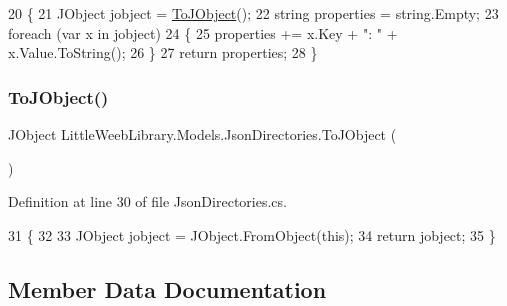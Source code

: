 \begin{DoxyCode}
20         \{
21             JObject jobject = \mbox{\hyperlink{class_little_weeb_library_1_1_models_1_1_json_directories_a66a155b005f6c2c19eb95ddd912a64ee}{ToJObject}}();
22             \textcolor{keywordtype}{string} properties = \textcolor{keywordtype}{string}.Empty;
23             \textcolor{keywordflow}{foreach} (var x \textcolor{keywordflow}{in} jobject)
24             \{
25                 properties += x.Key + \textcolor{stringliteral}{": "} + x.Value.ToString();
26             \}
27             \textcolor{keywordflow}{return} properties;
28         \}
\end{DoxyCode}
\mbox{\label{class_little_weeb_library_1_1_models_1_1_json_directories_a66a155b005f6c2c19eb95ddd912a64ee}} 
\subsubsection{\texorpdfstring{To\+J\+Object()}{ToJObject()}}
{\footnotesize\ttfamily J\+Object Little\+Weeb\+Library.\+Models.\+Json\+Directories.\+To\+J\+Object (\begin{DoxyParamCaption}{ }\end{DoxyParamCaption})}



Definition at line 30 of file Json\+Directories.\+cs.


\begin{DoxyCode}
31         \{
32 
33             JObject jobject = JObject.FromObject(\textcolor{keyword}{this});
34             \textcolor{keywordflow}{return} jobject;
35         \}
\end{DoxyCode}


\subsection{Member Data Documentation}
\mbox{\label{class_little_weeb_library_1_1_models_1_1_json_directories_a370ad019604c1b719b921ea34f8b4f69}} 
